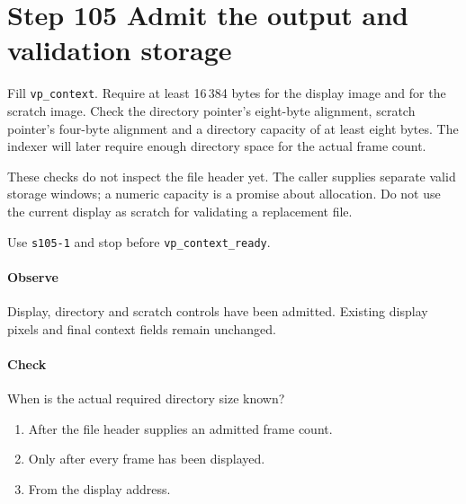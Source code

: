 \section{Step 105 Admit the output and validation storage}
Fill \texttt{vp\_context}. Require at least 16\,384 bytes for the display image and for the scratch image. Check the directory pointer's eight-byte alignment, scratch pointer's four-byte alignment and a directory capacity of at least eight bytes. The indexer will later require enough directory space for the actual frame count.

These checks do not inspect the file header yet. The caller supplies separate valid storage windows; a numeric capacity is a promise about allocation. Do not use the current display as scratch for validating a replacement file.

Use \texttt{s105-1} and stop before \texttt{vp\_context\_ready}.

\paragraph{Observe} Display, directory and scratch controls have been admitted. Existing display pixels and final context fields remain unchanged.

\paragraph{Check} When is the actual required directory size known?
\begin{enumerate}[label=\Alph*.]
\item After the file header supplies an admitted frame count.
\item Only after every frame has been displayed.
\item From the display address.
\end{enumerate}
